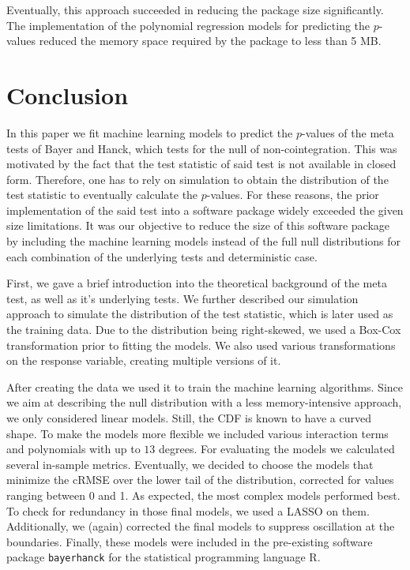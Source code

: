 \documentclass[12pt,a4paper]{article}
\begin{document}
Eventually, this approach succeeded in reducing the package size
significantly. The implementation of the polynomial regression models
for predicting the \(p\)-values reduced the memory space required by the
package to less than 5 MB.

\hypertarget{conclusion}{%
\section{Conclusion}\label{conclusion}}

In this paper we fit machine learning models to predict the \(p\)-values
of the meta tests of Bayer and Hanck, which tests for the null of
non-cointegration. This was motivated by the fact that the test
statistic of said test is not available in closed form. Therefore, one
has to rely on simulation to obtain the distribution of the test
statistic to eventually calculate the \(p\)-values. For these reasons,
the prior implementation of the said test into a software package widely
exceeded the given size limitations. It was our objective to reduce the
size of this software package by including the machine learning models
instead of the full null distributions for each combination of the
underlying tests and deterministic case.

First, we gave a brief introduction into the theoretical background of
the meta test, as well as it's underlying tests. We further described
our simulation approach to simulate the distribution of the test
statistic, which is later used as the training data. Due to the
distribution being right-skewed, we used a Box-Cox transformation prior
to fitting the models. We also used various transformations on the
response variable, creating multiple versions of it.

After creating the data we used it to train the machine learning
algorithms. Since we aim at describing the null distribution with a less
memory-intensive approach, we only considered linear models. Still, the
\ac{CDF} is known to have a curved shape. To make the models more
flexible we included various interaction terms and polynomials with up
to \(13\) degrees. For evaluating the models we calculated several
in-sample metrics. Eventually, we decided to choose the models that
minimize the \ac{cRMSE} over the lower tail of the distribution,
corrected for values ranging between 0 and 1. As expected, the most
complex models performed best. To check for redundancy in those final
models, we used a \ac{LASSO} on them. Additionally, we (again) corrected
the final models to suppress oscillation at the boundaries. Finally,
these models were included in the pre-existing software package
\texttt{bayerhanck} for the statistical programming language R.
\end{document}
